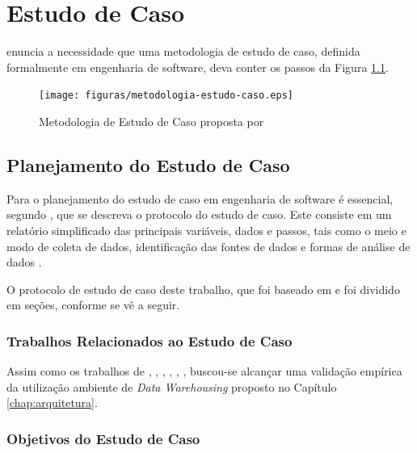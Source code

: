 \chapter{Estudo de Caso}
\label{estudo de caso}


 enuncia a necessidade que uma metodologia de estudo de caso, definida formalmente em engenharia de software, deva conter os passos da Figura \ref{fig:metodologia-estudo}.

\begin{figure}[ht!]
\centering
\texttt{[image: figuras/metodologia-estudo-caso.eps]}
\caption{Metodologia de Estudo de Caso proposta por }
\label{fig:metodologia-estudo}
\end{figure}
\FloatBarrier

\section{Planejamento do Estudo de Caso}
\label{sec:planning-case}
Para o planejamento do estudo de caso em engenharia de software é essencial, segundo , que se descreva o protocolo do estudo de caso. Este consiste em um relatório simplificado das principais variáveis, dados e passos, tais como o meio e modo de coleta de dados, identificação das fontes de dados e formas de análise de dados \cite{wohlin2012experimentation}. 


O protocolo de estudo de caso deste trabalho, que foi baseado em  e  foi dividido em seções, conforme se vê a seguir.


\subsection{Trabalhos Relacionados ao Estudo de Caso}

Assim como os trabalhos de , , , , , , buscou-se alcançar uma validação empírica da utilização ambiente de \textit{Data Warehousing} proposto no Capítulo \ref{chap:arquitetura}.


\subsection{Objetivos do Estudo de Caso}


